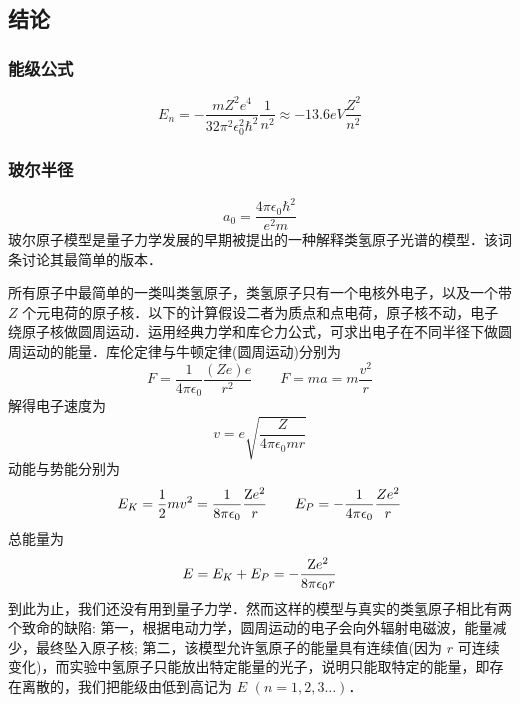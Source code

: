 
\subsection{结论}
\subsubsection{能级公式}
\begin{equation}
{E_n} =  - \frac{{m{Z^2}{e^4}}}{{32{\pi ^2}\epsilon _0^2{\hbar ^2}}}\frac{1}{{{n^2}}} \approx  - 13.6eV\frac{{{Z^2}}}{{{n^2}}}
\end{equation}
\subsubsection{玻尔半径}
\begin{equation}
{a_0} = \frac{{4\pi {\epsilon _0}{\hbar ^2}}}{{{e^2}m}}
\end{equation}
玻尔原子模型是量子力学发展的早期被提出的一种解释类氢原子光谱的模型．该词条讨论其最简单的版本．

所有原子中最简单的一类叫类氢原子，类氢原子只有一个电核外电子，以及一个带 $Z$ 个元电荷的原子核．以下的计算假设二者为质点和点电荷，原子核不动，电子绕原子核做圆周运动．运用经典力学和库仑力公式，可求出电子在不同半径下做圆周运动的能量．库伦定律与牛顿定律(圆周运动)分别为
\begin{equation}
F = \frac{1}{{4\pi {\epsilon _0}}}\frac{{(Ze)e}}{{{r^2}}}
\qquad
F = ma = m\frac{{{v^2}}}{r}
\end{equation}
解得电子速度为
\begin{equation}\label{BohrMd_eq2}
v = e\sqrt {\frac{Z}{{4\pi {\epsilon _0}mr}}} 
\end{equation}
动能与势能分别为
\begin{equation}
{E_K} = \frac{1}{2}m{v^2} = \frac{1}{{8\pi {\epsilon _0}}}\frac{{{\rm{Z}}{e^2}}}{r}
\qquad
{E_P} =  - \frac{1}{{4\pi {\epsilon _0}}}\frac{{Z{e^2}}}{r}
\end{equation}   
总能量为
\begin{equation}\label{BohrMd_eq4}
E = {E_K} + {E_P} =  - \frac{{{\rm{Z}}{e^2}}}{{8\pi {\epsilon _0}r}}
\end{equation}
到此为止，我们还没有用到量子力学．然而这样的模型与真实的类氢原子相比有两个致命的缺陷: 第一，根据电动力学，圆周运动的电子会向外辐射电磁波，能量减少，最终坠入原子核; 第二，该模型允许氢原子的能量具有连续值(因为 $r$ 可连续变化)，而实验中氢原子只能放出特定能量的光子，说明只能取特定的能量，即存在离散的，我们把能级由低到高记为 $E$  $(n = 1,2,3\dots)$． 

